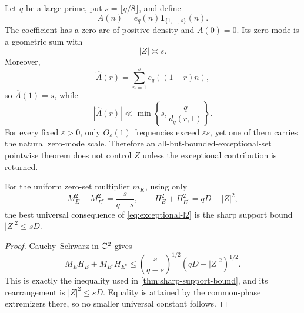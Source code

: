 \begin{example}
\label{ex:bounded-exceptional-set}
Let \(q\) be a large prime, put \(s=\lfloor q/8\rfloor\), and define
\[
 A(n)=e_q(n)\mathbf1_{\{1,\ldots,s\}}(n).
\]
The coefficient has a zero arc of positive density and \(A(0)=0\).
Its zero mode is a geometric sum with
\[
 |Z|\asymp s.
\]
Moreover,
\[
 \widehat A(r)
 =\sum_{n=1}^{s}e_q((1-r)n),
\]
so \(\widehat A(1)=s\), while
\[
 |\widehat A(r)|
 \ll
 \min\left\{s,\frac{q}{d_q(r,1)}\right\}.
\]
For every fixed \(\varepsilon>0\), only
\(O_\varepsilon(1)\) frequencies exceed \(\varepsilon s\), yet one
of them carries the natural zero-mode scale.  Therefore an
all-but-bounded-exceptional-set pointwise theorem does not control
\(Z\) unless the exceptional contribution is returned.
\end{example}

\begin{proposition}
\label{prop:no-automatic-gain}
For the uniform zero-set multiplier \(m_K\), using only
\[
 M_E^2+M_{E^c}^2=\frac{s}{q-s},
\qquad
 H_E^2+H_{E^c}^2=qD-|Z|^2,
\]
the best universal consequence of
\eqref{eq:exceptional-l2} is the sharp support bound
\(|Z|^2\le sD\).
\end{proposition}

\begin{proof}
Cauchy--Schwarz in \(\mathbb C^2\) gives
\[
 M_EH_E+M_{E^c}H_{E^c}
 \le
 \left(\frac{s}{q-s}\right)^{1/2}
 (qD-|Z|^2)^{1/2}.
\]
This is exactly the inequality used in
\cref{thm:sharp-support-bound}, and its rearrangement is
\(|Z|^2\le sD\).  Equality is attained by the common-phase
extremizers there, so no smaller universal constant follows.
\end{proof}

